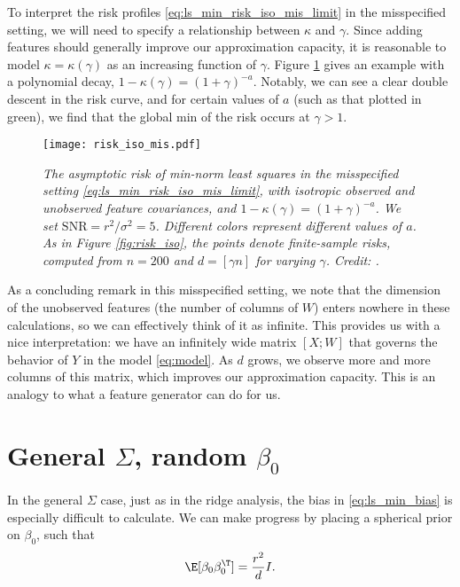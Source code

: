 \documentclass{article}
\begin{document}
To interpret the risk profiles \eqref{eq:ls_min_risk_iso_mis_limit} in the
misspecified setting, we will need to specify a relationship between $\kappa$
and $\gamma$. Since adding features should generally improve our approximation
capacity, it is reasonable to model $\kappa=\kappa(\gamma)$ as an increasing 
function of $\gamma$. Figure \ref{fig:risk_iso_mis} gives an example with a
polynomial decay, $1-\kappa(\gamma) = (1+\gamma)^{-a}$. Notably, we can see a
clear double descent in the risk curve, and for certain values of $a$ (such as
that plotted in green), we find that the global min of the risk occurs at
$\gamma > 1$.  

\begin{figure}[htb]
\centering
\texttt{[image: risk\_iso\_mis.pdf]}
\caption{\it The asymptotic risk of min-norm least squares in the misspecified
  setting \eqref{eq:ls_min_risk_iso_mis_limit}, with isotropic observed and
  unobserved feature covariances, and $1-\kappa(\gamma) = (1+\gamma)^{-a}$. We
  set $\mathrm{SNR} = r^2 / \sigma^2 = 5$. Different colors represent different
  values of $a$. As in Figure \ref{fig:risk_iso}, the points denote
  finite-sample risks, computed from $n=200$ and $d=[\gamma n]$ for varying 
  $\gamma$. Credit: \citet{hastie2022surprises}.}   
\label{fig:risk_iso_mis}
\end{figure}

As a concluding remark in this misspecified setting, we note that the dimension
of the unobserved features (the number of columns of $W$) enters nowhere in
these calculations, so we can effectively think of it as infinite. This provides
us with a nice interpretation: we have an infinitely wide matrix $[X; W]$ that 
governs the behavior of $Y$ in the model \eqref{eq:model}. As $d$ grows, we
observe more and more columns of this matrix, which improves our approximation
capacity. This is an analogy to what a feature generator can do for us.       

\section{General $\Sigma$, random $\beta_0$}

In the general $\Sigma$ case, just as in the ridge analysis, the bias in 
\eqref{eq:ls_min_bias} is especially difficult to calculate. We can make
progress by placing a spherical prior on $\beta_0$, such that        
\begin{equation}
\label{eq:prior}
\E[\beta_0 \beta_0^\T] = \frac{r^2}{d} I.
\end{equation}
\end{document}
